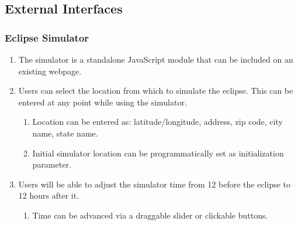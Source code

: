 \documentclass[10pt, onecolumn, draftclsnofoot, letterpaper, compsoc]{IEEEtran}
\begin{document}
\subsection{External Interfaces}

\subsubsection{Eclipse Simulator}
	\begin{enumerate}
		\item The simulator is a standalone JavaScript module that can
		be included on an existing webpage.

		\item Users can select the location from which to simulate the eclipse.
		This can be entered at any point while using the simulator.
		\begin{enumerate}
			\item Location can be entered as: latitude/longitude, address, zip code,
			city name, state name.
			\item Initial simulator location can be programmatically set as
			initialization parameter.
		\end{enumerate}

		\item Users will be able to adjust the simulator time from 12 before
		the eclipse to 12 hours after it.
		\begin{enumerate}
			\item Time can be advanced via a draggable slider or clickable buttons.
		\end{enumerate}

	\end{enumerate}
\end{document}
